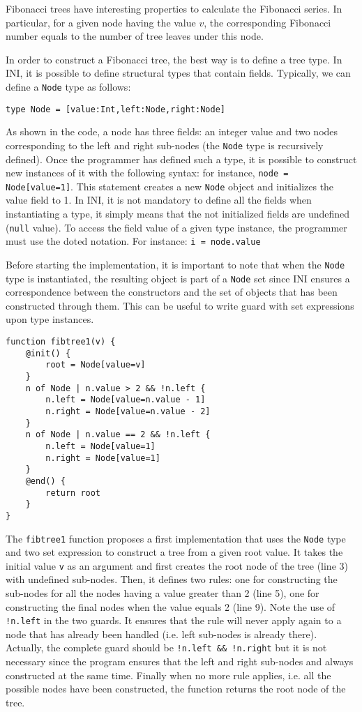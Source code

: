\documentclass[11pt]{article}
\begin{document}
Fibonacci trees have interesting properties to calculate the Fibonacci series. In particular, for a given node having the value $v$, the corresponding Fibonacci number equals to the number of tree leaves under this node.

In order to construct a Fibonacci tree, the best way is to define a tree type. In INI, it is possible to define structural types that contain fields. Typically, we can define a \texttt{Node} type as follows:

\begin{lstlisting}[numbers=none]
type Node = [value:Int,left:Node,right:Node]
\end{lstlisting}

As shown in the code, a node has three fields: an integer value and two nodes corresponding to the left and right sub-nodes (the \texttt{Node} type is recursively defined). Once the programmer has defined such a type, it is possible to construct new instances of it with the following syntax: for instance, \texttt{node = Node[value=1]}. This statement creates a new \texttt{Node} object and initializes the value field to 1. In INI, it is not mandatory to define all the fields when instantiating a type, it simply means that the not initialized fields are undefined (\texttt{null} value). To access the field value of a given type instance, the programmer must use the doted notation. For instance: \texttt{i = node.value}

Before starting the implementation, it is important to note that when the \texttt{Node} type is instantiated, the resulting object is part of a \texttt{Node} set since INI ensures a correspondence between the constructors and the set of objects that has been constructed through them. This can be useful to write guard with set expressions upon type instances.

\begin{lstlisting}
function fibtree1(v) {
	@init() {
		root = Node[value=v]
	}
	n of Node | n.value > 2 && !n.left {
		n.left = Node[value=n.value - 1]
		n.right = Node[value=n.value - 2]
	}
	n of Node | n.value == 2 && !n.left {
		n.left = Node[value=1]
		n.right = Node[value=1]
	}
	@end() {
		return root
	}
}
\end{lstlisting}

The \texttt{fibtree1} function proposes a first implementation that uses the \texttt{Node} type and two set expression to construct a tree from a given root value. It takes the initial value \texttt{v} as an argument and first creates the root node of the tree (line 3) with undefined sub-nodes. Then, it defines two rules: one for constructing the sub-nodes for all the nodes having a value greater than 2 (line 5), one for constructing the final nodes when the value equals 2 (line 9). Note the use of \texttt{!n.left} in the two guards. It ensures that the rule will never apply again to a node that has already been handled (i.e. left sub-nodes is already there). Actually, the complete guard should be \texttt{!n.left \&\& !n.right} but it is not necessary since the program ensures that the left and right sub-nodes and always constructed at the same time. Finally when no more rule applies, i.e. all the possible nodes have been constructed, the function returns the root node of the tree.
\end{document}
